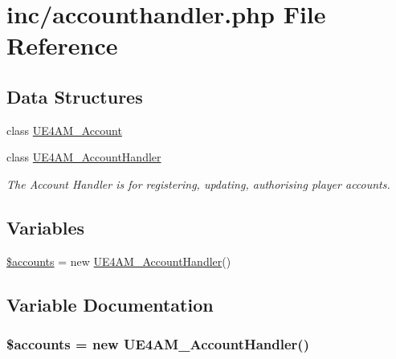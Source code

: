 \hypertarget{accounthandler_8php}{\section{inc/accounthandler.php File Reference}
\label{accounthandler_8php}
}
\subsection*{Data Structures}
\begin{DoxyCompactItemize}
\item 
class \hyperlink{class_u_e4_a_m___account}{U\-E4\-A\-M\-\_\-\-Account}
\item 
class \hyperlink{class_u_e4_a_m___account_handler}{U\-E4\-A\-M\-\_\-\-Account\-Handler}
\begin{DoxyCompactList}\small\item\em The Account Handler is for registering, updating, authorising player accounts. \end{DoxyCompactList}\end{DoxyCompactItemize}
\subsection*{Variables}
\begin{DoxyCompactItemize}
\item 
\hyperlink{accounthandler_8php_af16f8f012c129eff0333cc8cbf4a3327}{\$accounts} = new \hyperlink{class_u_e4_a_m___account_handler}{U\-E4\-A\-M\-\_\-\-Account\-Handler}()
\end{DoxyCompactItemize}


\subsection{Variable Documentation}
\hypertarget{accounthandler_8php_af16f8f012c129eff0333cc8cbf4a3327}{
\subsubsection[{\$accounts}]{\setlength{\rightskip}{0pt plus 5cm}\$accounts = new {\bf U\-E4\-A\-M\-\_\-\-Account\-Handler}()}}\label{accounthandler_8php_af16f8f012c129eff0333cc8cbf4a3327}
